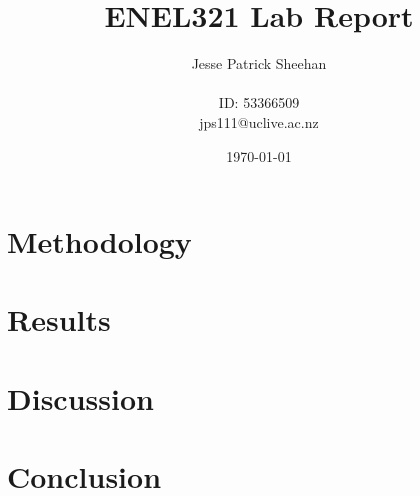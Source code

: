 \documentclass[12pt]{article} %
\title{ENEL321 Lab Report}
\date{\today}
\author{
	Jesse Patrick Sheehan\\
	\\
	{\small{ID: 53366509}}\\
	{\small{jps111@uclive.ac.nz}}\\
}
\begin{document}
\maketitle

\vfill

\renewcommand{\abstractname}{Executive Summary}

\begin{abstract}


\blindtext

\end{abstract}

\newpage

\section{Methodology}


\blindtext

\blindtext

\blindtext

\newpage

\section{Results}


\blindtext

\blindtext

\blindtext

\newpage

\section{Discussion}


\blindtext

\blindtext

\blindtext

\newpage

\section{Conclusion}


\blindtext

\blindtext

\blindtext
\end{document}
